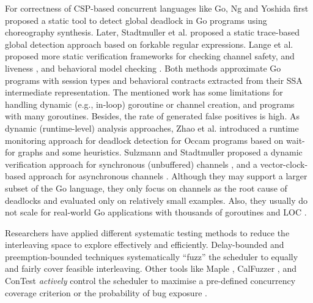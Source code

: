 For correctness of CSP-based concurrent languages like Go, Ng and Yoshida \cite{ng-dl-cc16} first proposed a static tool to detect global deadlock in Go programs using choreography synthesis.
%
Later, Stadtmuller et al. \cite{stadtmuller-minigo-aplas16} proposed a static trace-based global detection approach based on forkable regular expressions.
%
Lange et al. proposed more static verification frameworks for checking channel safety, and liveness \cite{lange-fence-popl17}, and behavioral model checking \cite{lange-staticType-icse18}.
%
Both methods approximate Go programs with session types and behavioral contracts extracted from their SSA intermediate representation.
%
The mentioned work has some limitations for handling dynamic (e.g., in-loop) goroutine or channel creation, and programs with many goroutines. Besides, the rate of generated false positives is high.
%
As dynamic (runtime-level) analysis approaches, Zhao et al. \cite{zhao-occam97} introduced a runtime monitoring approach for deadlock detection for Occam programs based on wait-for graphs and some heuristics.
%
Sulzmann and Stadtmuller proposed a dynamic verification approach for synchronous (unbuffered) channels \cite{sulzmann-corr17}, and a vector-clock-based approach for asynchronous channels \cite{sulzmann-twophase-2018}.
%
Although they may support a larger subset of the Go language, they only focus on channels as the root cause of deadlocks and evaluated only on relatively small examples.
%
Also, they usually do not scale for real-world Go applications with thousands of goroutines and LOC \cite{dilley-empirical-saner19}.

%
Researchers have applied different systematic testing methods \cite{thomson-concurrencyTesting-ppopp14} to reduce the interleaving space to explore effectively and efficiently.
%
Delay-bounded \cite{emmi-delayBounded-popl11,burckhardt-depthBug-asplos10} and preemption-bounded \cite{madanlal-preemptionBound-pldi07} techniques systematically ``fuzz'' the scheduler to equally and fairly cover feasible interleaving.
%
Other tools like Maple \cite{yu-maple-oopsla12}, CalFuzzer \cite{joshi-calfuzzer},  and ConTest \cite{edelstein2003contest} \textit{actively} control the scheduler to maximise a pre-defined concurrency coverage criterion \cite{hong-syncTesting-issta12} or the probability of bug exposure \cite{burckhardt-depthBug-asplos10}.
